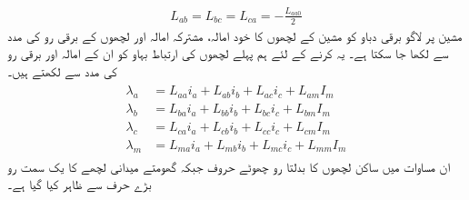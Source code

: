 \begin{align}\label{مساوات_معاصر_ساکن_مشترکہ_امالہ}
L_{ab}=L_{bc}=L_{ca}=-\frac{L_{aa0}}{2}
\end{align}
%
مشین پر لاگو برقی دباو کو مشین کے لچھوں کا خود امالہ، مشترکہ امالہ اور لچھوں کے برقی رو کی مدد سے لکھا جا سکتا ہے۔ یہ کرنے کے لئے ہم پہلے  لچھوں کی ارتباط بہاو  کو ان کے امالہ اور برقی رو کی مدد سے لکھتے ہیں۔
\begin{gather}
\begin{aligned}\label{مساوات_معاصر_ارتباط_چار}
\lambda_a&=L_{aa} i_a+L_{ab} i_b +L_{ac} i_c+L_{am} I_m\\
\lambda_b&=L_{ba} i_a+L_{bb} i_b +L_{bc} i_c+L_{bm} I_m\\
\lambda_c&=L_{ca} i_a+L_{cb} i_b +L_{cc} i_c+L_{cm} I_m\\
\lambda_m&=L_{ma} i_a+L_{mb} i_b +L_{mc} i_c+L_{mm} I_m
\end{aligned}
\end{gather}
ان مساوات میں ساکن لچھوں کا بدلتا رو  چھوٹے حروف   جبکہ گھومتے میدانی لچھے کا یک سمت   رو  بڑے حرف   سے ظاہر کیا گیا ہے۔

